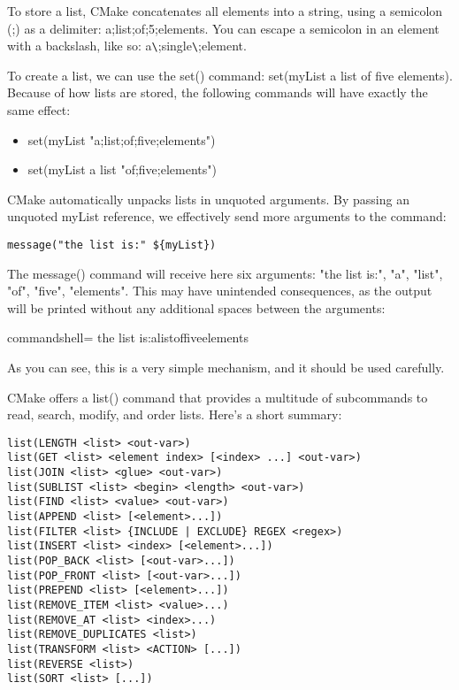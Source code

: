To store a list, CMake concatenates all elements into a string, using a semicolon (;) as a delimiter: a;list;of;5;elements. You can escape a semicolon in an element with a backslash, like so: a\verb|\|;single\verb|\|;element.

To create a list, we can use the set() command: set(myList a list of five elements). Because of how lists are stored, the following commands will have exactly the same effect:

\begin{itemize}
\item 
set(myList "a;list;of;five;elements")

\item 
set(myList a list "of;five;elements")
\end{itemize}

CMake automatically unpacks lists in unquoted arguments. By passing an unquoted myList reference, we effectively send more arguments to the command:

\begin{lstlisting}[style=styleCMake]
message("the list is:" ${myList})
\end{lstlisting}

The message() command will receive here six arguments: "the list is:", "a", "list", "of", "five", "elements". This may have unintended consequences, as the output will be printed without any additional spaces between the arguments:

\begin{tcblisting}{commandshell={}}
the list is:alistoffiveelements
\end{tcblisting}

As you can see, this is a very simple mechanism, and it should be used carefully.

CMake offers a list() command that provides a multitude of subcommands to read, search, modify, and order lists. Here's a short summary:

\begin{lstlisting}[style=styleCMake]
list(LENGTH <list> <out-var>)
list(GET <list> <element index> [<index> ...] <out-var>)
list(JOIN <list> <glue> <out-var>)
list(SUBLIST <list> <begin> <length> <out-var>)
list(FIND <list> <value> <out-var>)
list(APPEND <list> [<element>...])
list(FILTER <list> {INCLUDE | EXCLUDE} REGEX <regex>)
list(INSERT <list> <index> [<element>...])
list(POP_BACK <list> [<out-var>...])
list(POP_FRONT <list> [<out-var>...])
list(PREPEND <list> [<element>...])
list(REMOVE_ITEM <list> <value>...)
list(REMOVE_AT <list> <index>...)
list(REMOVE_DUPLICATES <list>)
list(TRANSFORM <list> <ACTION> [...])
list(REVERSE <list>)
list(SORT <list> [...])
\end{lstlisting}

